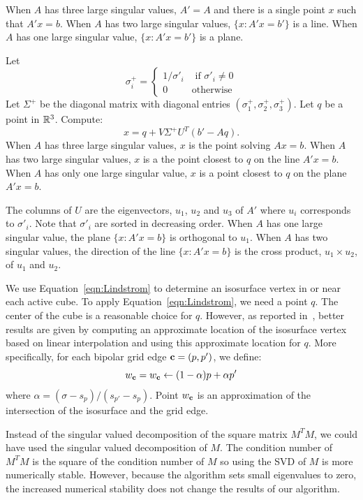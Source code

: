 When $A$ has three large singular values, $A' = A$
and there is a single point $x$ such that $A'x = b$.
When $A$ has two large singular values, 
$\{x : A'x = b' \}$ is a line.
When $A$ has one large singular value, 
$\{ x: A'x = b' \}$ is a plane.

Let 
\begin{equation*}
\sigma^+_i = \left \{ 
\begin{array}{ll}
1/\sigma'_i & \mbox { if } \sigma'_i \neq 0 \\
0 & \mbox{otherwise}
\end{array}
\right .
\end{equation*}
Let $\Sigma^+$ be the diagonal matrix with diagonal entries
$(\sigma^+_1, \sigma^+_2, \sigma^+_3)$.
Let $q$ be a point in $\mathbb{R}^{3}$.
Compute:
\begin{equation}
x = q + V \Sigma^+ U^T(b' - Aq).
\label{eqn:Lindstrom}
\end{equation}
When $A$ has three large singular values,
$x$ is the point solving $Ax = b$.
When $A$ has two large singular values,
$x$ is a the point closest to $q$ on the line $A'x = b$.
When $A$ has only one large singular value,
$x$ is a point closest to $q$ on the plane $A'x = b$.

The columns of $U$ are the eigenvectors, $u_1$, $u_2$ and $u_3$ of $A'$
where $u_i$ corresponds to $\sigma'_i$.
Note that $\sigma'_i$ are sorted in decreasing order.
When $A$ has one large singular value,
the plane $\{x: A'x = b\}$ is orthogonal to $u_1$.
When $A$ has two singular values,
the direction of the line $\{x: A'x = b\}$ 
is the cross product, $u_1 \times u_2$, of $u_1$ and $u_2$.

We use Equation~\ref{eqn:Lindstrom}
to determine an isosurface vertex in or near each active cube.
To apply Equation~\ref{eqn:Lindstrom},
we need a point $q$.
The center of the cube is a reasonable choice for $q$.
However, as reported in~\cite{sw-dcss-02},
better results are given by computing an approximate location
of the isosurface vertex based on linear interpolation
and using this approximate location for $q$.
More specifically,
for each bipolar grid edge $\mathbf{c}=(p,p')$,
we define:
\begin{equation*}
w_{\mathbf{c}} = w_{\mathbf{c}} \leftarrow (1-\alpha) p + \alpha p'
\end{equation*}
where $\alpha = (\sigma-s_p)/(s_{p'}-s_p)$.
Point $w_{\mathbf{c}}$ is an approximation of the intersection of the isosurface
and the grid edge.

Instead of the singular valued decomposition of the square matrix $M^T M$,
we could have used the singular valued decomposition of $M$.
The condition number of $M^T M$ is the square of the condition number of $M$
so using the SVD of $M$ is more numerically stable.
However, because the algorithm sets small eigenvalues to zero,
the increased numerical stability does not change the results of our algorithm.


